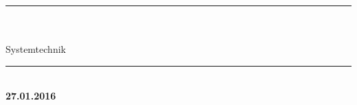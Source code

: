 
\begin{titlepage}
	
	\vspace*{\fill}

	{\begin{center} \bfseries\huge
			\rule{17.5cm}{0.1mm}  
			\\[5mm]
			\mythema\\%
			Systemtechnik
			\rule{17.5cm}{0.1mm}  
	\end{center}}
	
	{\begin{center} \bfseries\small
		\myauthor
		\myclass\\
		27.01.2016
	\end{center}}
	
	\vspace*{\fill}
	

\end{titlepage}
